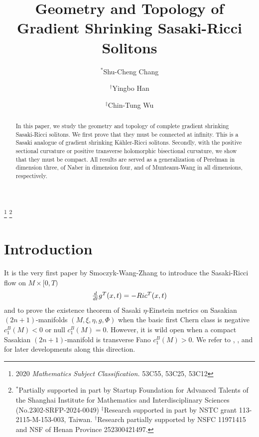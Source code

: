 \documentclass[12pt]{amsart}%
\numberwithin{equation}{section}
\begin{document}
\title[Gradient Shrinking Sasaki-Ricci Solitons]{Geometry and Topology of Gradient Shrinking Sasaki-Ricci Solitons}
\author{$^{\ast}$Shu-Cheng Chang}
\address{$^{\ast}$Shanghai Institute of Mathematics and Interdisciplinary Sciences,
Shanghai, 200433, China}
\author{$^{\dag}$Yingbo Han}
\address{$^{\dag}${School of Mathematics and Statistics, Xinyang Normal University}\\
Xinyang,464000, Henan, P.R. China}
\author{$^{\ddag}$Chin-Tung Wu}
\address{$^{\ddag}$Department of Applied Mathematics, National Pingtung University,
Pingtung 90003, Taiwan}
\thanks{2020 \emph{Mathematics Subject Classification.} 53C55, 53C25, 53C12}
\thanks{$^{\ast}$Partially supported in part by Startup Foundation for Advanced
Talents of the Shanghai Institute for Mathematics and Interdisciplinary
Sciences (No.2302-SRFP-2024-0049) $^{\ddag}$Research supported in part by NSTC
grant 113-2115-M-153-003, Taiwan. $^{\dag}$Research partially supported by
NSFC 11971415 and NSF of Henan Province 252300421497.}

\begin{abstract}
In this paper, we study the geometry and topology of complete gradient
shrinking Sasaki-Ricci solitons. We first prove that they must be connected at
infinity. This is a Sasaki analogue of gradient shrinking K\"{a}hler-Ricci
solitons. Secondly, with the positive sectional curvature or positive
transverse holomorphic bisectional curvature, we show that they must be
compact. All results are served as a generalization of Perelman in dimension
three, of Naber in dimension four, and of Munteanu-Wang in all dimensions, respectively.

\end{abstract}
\maketitle


\section{Introduction}

It is the very first paper by Smoczyk-Wang-Zhang \cite{swz} to introduce the
Sasaki-Ricci flow on $M\times\lbrack0,T)$%
\[%
\begin{array}
[c]{c}%
\frac{d}{dt}g^{T}(x,t)=-Ric^{T}(x,t)
\end{array}
\]
and to prove the existence theorem of Sasaki $\eta$-Einstein metrics on
Sasakian $(2n+1)$-manifolds $(M,\xi,\eta,g,\Phi)$ when the basic first Chern
class is negative $c_{1}^{B}(M)<0$ or null $c_{1}^{B}(M)=0$. However, it is
wild open when a compact Sasakian $(2n+1)$-manifold is transverse Fano
$c_{1}^{B}(M)>0.$ We refer to \cite{cj}, \cite{chlw}, \cite{cllw} and
\cite{cclw} for later developments along this direction.
\end{document}
